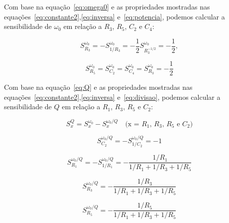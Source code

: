 Com base na equação~\ref{eq:omega0} e as propriedades mostradas nas equações~\ref{eq:constante2},\ref{eq:inversa} e~\ref{eq:potencia}, podemos calcular a sensibilidade de $\omega_0$ em relação a $R_3$, $R_5$, $C_2$ e $C_4$:

\begin{equation}
    S^{\omega_0}_{R_3} = - S^{\omega_0}_{1/R_3} = -\frac{1}{2} S^{\omega_0}_{R^{-1/2}_3} = -\frac{1}{2},
\end{equation}

\begin{equation}
    S^{\omega_0}_{R_5} = S^{\omega_0}_{C_2} = S^{\omega_0}_{C_4} = S^{\omega_0}_{R_3} = - \frac{1}{2}
\end{equation}

Com base na equação~\ref{eq:Q} e as propriedades mostradas nas equações~\ref{eq:constante2},\ref{eq:inversa} e~\ref{eq:divisao}, podemos calcular a sensibilidade de $Q$ em relação a $R_1$, $R_3$, $R_5$ e $C_2$:

\begin{equation}
    S^{Q}_{x} = S^{\omega_0}_{x} - S^{\omega_0/Q}_{x} \quad \text{(x = $R_1$, $R_3$, $R_5$ e $C_2$)}
\end{equation}

\begin{equation}
    S^{\omega_0/Q}_{C_2} = -S^{\omega_0/Q}_{1/C_2} = -1
\end{equation}

\begin{equation}
    S^{\omega_0/Q}_{R_1} = -S^{\omega_0/Q}_{1/R_1} = -\frac{1/R_1}{1/R_1 + 1/R_3 + 1/R_5}
\end{equation}

\begin{equation}
    S^{\omega_0/Q}_{R_3} = -\frac{1/R_3}{1/R_1 + 1/R_3 + 1/R_5}
\end{equation}

\begin{equation}
    S^{\omega_0/Q}_{R_5} = -\frac{1/R_5}{1/R_1 + 1/R_3 + 1/R_5}
\end{equation}